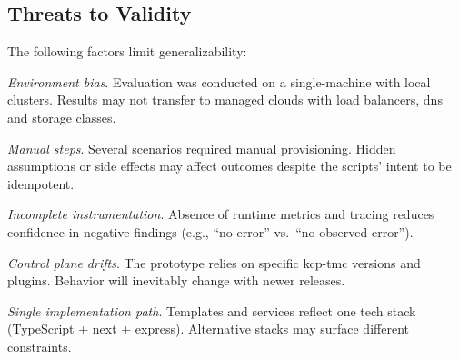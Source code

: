 \documentclass[11pt, a4paper, oneside, listof=totoc]{scrartcl}
\begin{document}
        \subsection{Threats to Validity}\label{subsec:evalThreatsToValidity}
            The following factors limit generalizability:
            \begin{enumerate}[label={[\arabic*]:},
                ref=Challenge~\arabic*,
                leftmargin=*,
                itemsep=0.6\baselineskip]

                \item\label{chal:evalValidityEnvironmentBias}
                    \textit{Environment bias}.
                    Evaluation was conducted on a single-machine with local clusters.
                    Results may not transfer to managed clouds with load balancers, \gls{dns} and
                    storage classes.

                \item\label{chal:evalValidityPrototypeBias}
                    \textit{Manual steps}.
                    Several scenarios required manual provisioning.
                    Hidden assumptions or side effects may affect outcomes despite the scripts'
                    intent to be idempotent.

                \item\label{chal:evalValidityIncompleteInstrumentation}
                    \textit{Incomplete instrumentation}.
                    Absence of runtime metrics and tracing reduces confidence in negative findings
                    (e.g., \enquote{no error} vs.\ \enquote{no observed error}).

                \item\label{chal:evalValidityControlPlaneDrifts}
                    \textit{Control plane drifts}.
                    The prototype relies on specific \gls{kcp}-\gls{tmc} versions and plugins.
                    Behavior will inevitably change with newer releases.

                \item\label{chal:evalValiditySingleImplementationPath}
                    \textit{Single implementation path}.
                    Templates and services reflect one tech stack (TypeScript + \gls{next} + \gls{express}).
                    Alternative stacks may surface different constraints.
            \end{enumerate}
\end{document}
